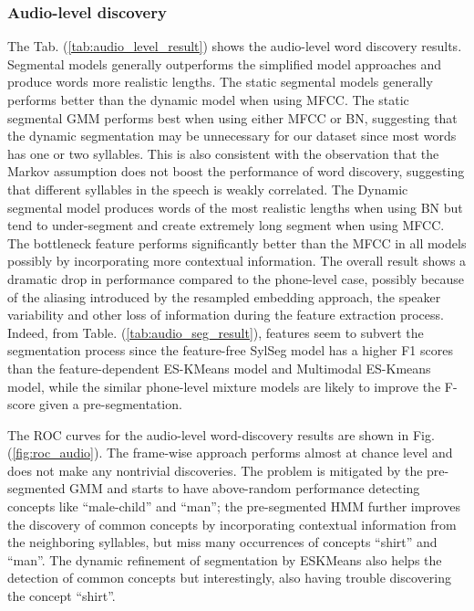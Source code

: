 \documentclass[journal]{IEEEtran}
\begin{document}
\subsubsection{Audio-level discovery}
The Tab. (\ref{tab:audio_level_result}) shows the audio-level word discovery results. Segmental models generally outperforms the simplified model approaches and produce words more realistic lengths. The static segmental models generally performs better than the dynamic model when using MFCC. The static segmental GMM performs best when using either MFCC or BN, suggesting that the dynamic segmentation may be unnecessary for our dataset since most words has one or two syllables. This is also consistent with the observation that the Markov assumption does not boost the performance of word discovery, suggesting that different syllables in the speech is weakly correlated. The Dynamic segmental model produces words of the most realistic lengths when using BN but tend to under-segment and create extremely long segment when using MFCC. The bottleneck feature performs significantly better than the MFCC in all models possibly by incorporating more contextual information. The overall result shows a dramatic drop in performance compared to the phone-level case, possibly because of the aliasing introduced by the resampled embedding approach, the speaker variability and other loss of information during the feature extraction process. Indeed, from Table. (\ref{tab:audio_seg_result}), features seem to subvert the segmentation process since the feature-free SylSeg model has a higher F1 scores than the feature-dependent ES-KMeans model and Multimodal ES-Kmeans model, while the similar phone-level mixture models are likely to improve the F-score given a pre-segmentation. 

The ROC curves for the audio-level word-discovery results are shown in Fig. (\ref{fig:roc_audio}). The frame-wise approach performs almost at chance level and does  not make any nontrivial discoveries. The problem is mitigated by the pre-segmented GMM and starts to have above-random performance detecting concepts like ``male-child'' and ``man''; the pre-segmented HMM further improves the discovery of common concepts by incorporating contextual information from the neighboring syllables, but miss many occurrences of concepts ``shirt'' and ``man''. The dynamic refinement of segmentation by ESKMeans also helps the detection of common concepts but interestingly, also having trouble discovering the concept ``shirt''.   
\end{document}

